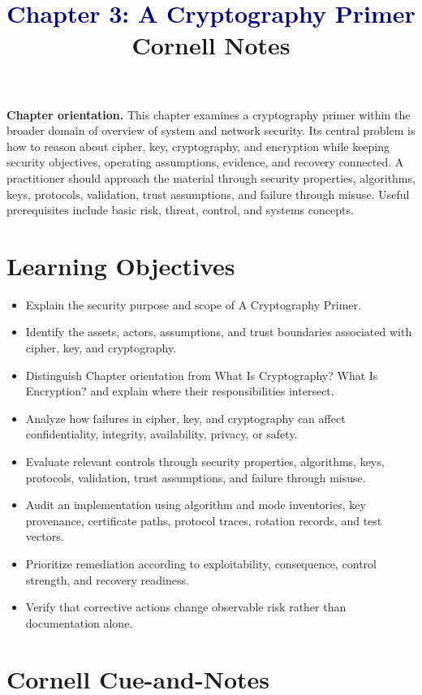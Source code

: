 \documentclass[11pt]{article}
\title{\textcolor{Navy}{Chapter 3: A Cryptography Primer}\\[2mm]\large Cornell Notes}
\author{}
\date{}
\begin{document}
\maketitle
\thispagestyle{fancy}
\vspace{-1.5em}
\begin{orientationbox}
\textbf{Chapter orientation.} This chapter examines a cryptography primer within the broader domain of overview of system and network security. Its central problem is how to reason about cipher, key, cryptography, and encryption while keeping security objectives, operating assumptions, evidence, and recovery connected. A practitioner should approach the material through security properties, algorithms, keys, protocols, validation, trust assumptions, and failure through misuse. Useful prerequisites include basic risk, threat, control, and systems concepts.
\end{orientationbox}
\section*{Learning Objectives}
\begin{itemize}
\item Explain the security purpose and scope of A Cryptography Primer.
\item Identify the assets, actors, assumptions, and trust boundaries associated with cipher, key, and cryptography.
\item Distinguish Chapter orientation from What Is Cryptography? What Is Encryption? and explain where their responsibilities intersect.
\item Analyze how failures in cipher, key, and cryptography can affect confidentiality, integrity, availability, privacy, or safety.
\item Evaluate relevant controls through security properties, algorithms, keys, protocols, validation, trust assumptions, and failure through misuse.
\item Audit an implementation using algorithm and mode inventories, key provenance, certificate paths, protocol traces, rotation records, and test vectors.
\item Prioritize remediation according to exploitability, consequence, control strength, and recovery readiness.
\item Verify that corrective actions change observable risk rather than documentation alone.
\end{itemize}
\section*{Cornell Cue-and-Notes}
\end{document}
